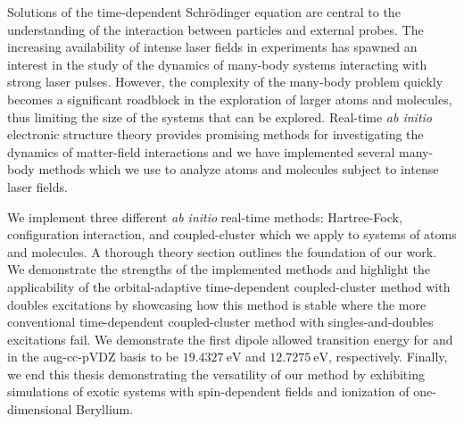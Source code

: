 Solutions of the time-dependent Schrödinger equation are central to the
understanding of the interaction between particles and external probes.
The increasing availability of intense laser fields in experiments has spawned
an interest in the study of the dynamics of many-body systems interacting with
strong laser pulses.
However, the complexity of the many-body problem quickly becomes a significant
roadblock in the exploration of larger atoms and molecules, thus limiting the
size of the systems that can be explored.
Real-time \textit{ab initio} electronic structure theory provides promising
methods for investigating the dynamics of matter-field interactions and we have
implemented several many-body methods which we use to analyze atoms and
molecules subject to intense laser fields.

We implement three different \textit{ab initio} real-time methods:
Hartree-Fock, configuration interaction, and coupled-cluster which we apply to
systems of atoms and molecules.
A thorough theory section outlines the foundation of our work.
We demonstrate the strengths of the implemented methods and highlight the
applicability of the orbital-adaptive time-dependent coupled-cluster method with
doubles excitations by showcasing how this method is stable where the more
conventional time-dependent coupled-cluster method with singles-and-doubles
excitations fail.
We demonstrate the first dipole allowed transition energy for  and
 in the aug-cc-pVDZ basis to be $\SI{19.4327}{\electronvolt}$ and
$\SI{12.7275}{\electronvolt}$, respectively.
Finally, we end this thesis demonstrating the versatility of our method by
exhibiting simulations of exotic systems with spin-dependent fields and
ionization of one-dimensional Beryllium.
